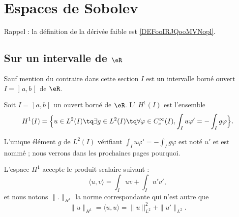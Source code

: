 
\section{Espaces de Sobolev}

Rappel : la définition de la dérivée faible est \ref{DEFooIRJQooMVNopl}.

\subsection{Sur un intervalle de \( \eR\)}

Sauf mention du contraire dans cette section \( I\) est un intervalle borné ouvert \( I=\mathopen] a , b \mathclose[\) de \( \eR\).

\begin{definition}
	Soit \( I=\mathopen] a , b \mathclose[\) un ouvert borné de \( \eR\). L' \( H^1(I)\) est l'ensemble
	\begin{equation}
		H^1(I)=\Big\{   u\in L^2(I)\tq\exists g\in L^2(I)\tq\forall \varphi\in  C^{\infty}_c(I),\int_Iu\varphi'=-\int_Ig\varphi   \Big\}.
	\end{equation}
\end{definition}

L'unique élément \( g\) de \( L^2(I)\) vérifiant \( \int_Iu\varphi'=-\int_Ig\varphi\) est noté \( u'\) et est nommé ; nous verrons dans les prochaines pages pourquoi.

L'espace \( H^1\) accepte le produit scalaire suivant :
\begin{equation}
	\langle u, v\rangle =\int_Iuv+\int_Iu'v',
\end{equation}
et nous notons \( \| . \|_{H^1}\) la norme correspondante qui n'est autre que
\begin{equation}
	\| u \|_{H^1}=\langle u, u\rangle =\| u \|^2_{L^2}+\| u' \|_{L^2}.
\end{equation}

